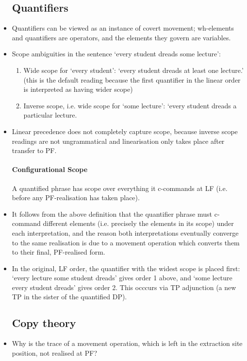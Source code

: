 \documentclass{article}
\begin{document}
\begin{itemize}
    \subsection{Quantifiers}
    \item Quantifiers can be viewed as an instance of covert movement; wh-elements and quantifiers are operators, and the elements they govern are variables.
    \item Scope ambiguities in the sentence `every student dreads some lecture':
    \begin{enumerate}
        \item Wide scope for `every student': `every student dreads at least one lecture.' (this is the default reading because the first quantifier in the linear order is interpreted as having wider scope)
        \item Inverse scope, i.e. wide scope for `some lecture': `every student dreads a particular lecture.
    \end{enumerate}
    \item Linear precedence does not completely capture scope, because inverse scope readings are not ungrammatical and linearisation only takes place after transfer to PF.
    \paragraph{Configurational Scope} A quantified phrase has scope over everything it c-commands at LF (i.e. before any PF-realisation has taken place).
    \item It follows from the above definition that the quantifier phrase must c-command different elements (i.e. precisely the elements in its scope) under each interpretation, and the reason both interpretations eventually converge to the same realisation is due to a movement operation which converts them to their final, PF-realised form.
    \item In the original, LF order, the quantifier with the widest scope is placed first: `every lecture some student dreads' gives order 1 above, and `some lecture every student dreads' gives order 2. This occcurs via TP adjunction (a new TP in the sister of the quantified DP).
    \subsection{Copy theory}
    \item Why is the trace of a movement operation, which is left in the extraction site position, not realised at PF?

\end{itemize}
\end{document}
